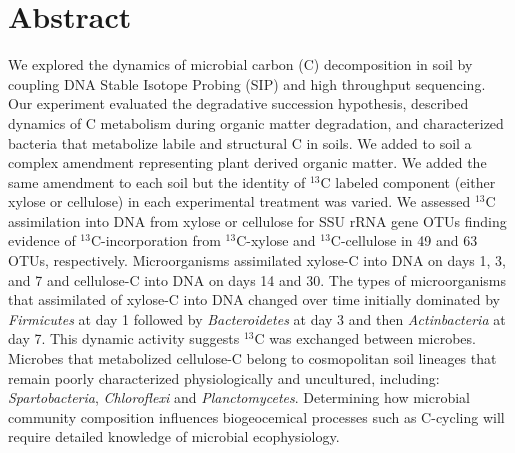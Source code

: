 \section{Abstract} We explored the dynamics of microbial carbon (C)
decomposition in soil by coupling DNA Stable Isotope Probing (SIP) and high
throughput sequencing. Our experiment evaluated the degradative succession
hypothesis, described dynamics of C metabolism during organic matter
degradation, and characterized bacteria that metabolize labile and structural
C in soils. We added to soil a complex amendment representing plant derived
organic matter. We added the same amendment to each soil but the identity of
$^{13}$C labeled component (either xylose or cellulose) in each experimental
treatment was varied. We assessed $^{13}$C assimilation into DNA from xylose or
cellulose for SSU rRNA gene OTUs finding evidence of $^{13}$C-incorporation
from $^{13}$C-xylose and $^{13}$C-cellulose in 49 and 63 OTUs, respectively.
Microorganisms assimilated xylose-C into DNA on days 1, 3, and 7 and
cellulose-C into DNA on days 14 and 30. The types of microorganisms that
assimilated of xylose-C into DNA changed over time initially dominated by
\textit{Firmicutes} at day 1 followed by \textit{Bacteroidetes} at day 3 and
then \textit{Actinbacteria} at day 7. This dynamic activity suggests $^{13}$C
was exchanged between microbes. Microbes that metabolized cellulose-C belong to
cosmopolitan soil lineages that remain poorly characterized physiologically and
uncultured, including: \textit{Spartobacteria}, \textit{Chloroflexi} and
\textit{Planctomycetes}. Determining how microbial community composition
influences biogeocemical processes such as C-cycling will require detailed
knowledge of microbial ecophysiology.
